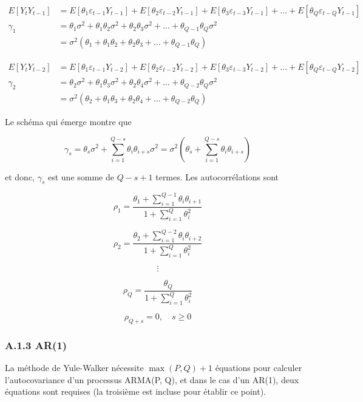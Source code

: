 \documentclass[
  letterpaper,
  DIV=11,
  numbers=noendperiod]{scrartcl}
\begin{document}
\[
\begin{aligned}
E[Y_t Y_{t-1}] &= E[\theta_1 \varepsilon_{t-1} Y_{t-1}] + E[\theta_2 \varepsilon_{t-2} Y_{t-1}] + E[\theta_3 \varepsilon_{t-3} Y_{t-1}] + \ldots + E[\theta_Q \varepsilon_{t-Q} Y_{t-1}] \\
\gamma_1 &= \theta_1 \sigma^2 + \theta_1 \theta_2 \sigma^2 + \theta_2 \theta_3 \sigma^2 + \ldots + \theta_{Q-1} \theta_Q \sigma^2 \\
&= \sigma^2 (\theta_1 + \theta_1 \theta_2 + \theta_2 \theta_3 + \ldots + \theta_{Q-1} \theta_Q)
\end{aligned}
\]

\[
\begin{aligned}
E[Y_t Y_{t-2}] &= E[\theta_1 \varepsilon_{t-1} Y_{t-2}] + E[\theta_2 \varepsilon_{t-2} Y_{t-2}] + E[\theta_3 \varepsilon_{t-3} Y_{t-2}] + \ldots + E[\theta_Q \varepsilon_{t-Q} Y_{t-2}] \\
\gamma_2 &= \theta_2 \sigma^2 + \theta_1 \theta_3 \sigma^2 + \theta_2 \theta_4 \sigma^2 + \ldots + \theta_{Q-2} \theta_Q \sigma^2 \\
&= \sigma^2 (\theta_2 + \theta_1 \theta_3 + \theta_2 \theta_4 + \ldots + \theta_{Q-2} \theta_Q)
\end{aligned}
\]

Le schéma qui émerge montre que

\[
\gamma_s = \theta_s \sigma^2 + \sum_{i=1}^{Q-s} \theta_i \theta_{i+s} \sigma^2 = \sigma^2 \left( \theta_s + \sum_{i=1}^{Q-s} \theta_i \theta_{i+s} \right)
\]

et donc, \(\gamma_s\) est une somme de \(Q-s + 1\) termes. Les
autocorrélations sont

\[
\rho_1 = \frac{\theta_1 + \sum_{i=1}^{Q-1} \theta_i \theta_{i+1}}{1 + \sum_{i=1}^{Q} \theta_i^2}
\]

\[
\rho_2 = \frac{\theta_2 + \sum_{i=1}^{Q-2} \theta_i \theta_{i+2}}{1 + \sum_{i=1}^{Q} \theta_i^2}
\]

\[
\vdots
\]

\[
\rho_Q = \frac{\theta_Q}{1 + \sum_{i=1}^{Q} \theta_i^2}
\]

\[
\rho_{Q+s} = 0, \quad s \geq 0
\]

\subsubsection{A.1.3 AR(1)}\label{a.1.3-ar1}

La méthode de Yule-Walker nécessite \(\max(P, Q) + 1\) équations pour
calculer l'autocovariance d'un processus ARMA(P, Q), et dans le cas d'un
AR(1), deux équations sont requises (la troisième est incluse pour
établir ce point).
\end{document}
